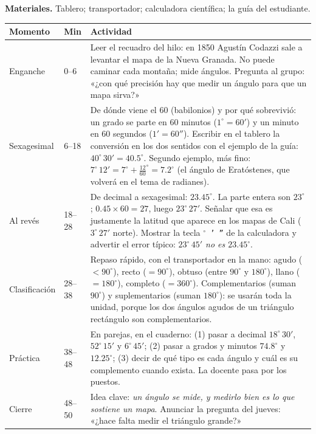\documentclass[11pt]{article}
\begin{document}
\textbf{Materiales.} Tablero; transportador; calculadora científica; la guía del estudiante.

\begin{center}
{\renewcommand{\arraystretch}{1.3}
\begin{tabularx}{\linewidth}{@{}l l X@{}}
  \toprule
  \textbf{Momento} & \textbf{Min} & \textbf{Actividad}\\
  \midrule
  Enganche & 0--6 & Leer el recuadro del hilo: en 1850 Agustín Codazzi sale a levantar el
    mapa de la Nueva Granada. No puede caminar cada montaña; mide ángulos. Pregunta al
    grupo: «¿con qué precisión hay que medir un ángulo para que un mapa sirva?»\\
  Sexagesimal & 6--18 & De dónde viene el 60 (babilonios) y por qué sobrevivió: un grado
    se parte en $60$ minutos ($1^\circ = 60'$) y un minuto en $60$ segundos ($1' = 60''$).
    Escribir en el tablero la conversión en los dos sentidos con el ejemplo de la guía:
    $40^\circ\,30' = \num{40,5}^\circ$. Segundo ejemplo, más fino:
    $7^\circ\,12' = 7^\circ + \frac{12}{60}^{\circ} = \num{7,2}^\circ$ (el ángulo de
    Eratóstenes, que volverá en el tema de radianes).\\
  Al revés & 18--28 & De decimal a sexagesimal: $\num{23,45}^\circ$. La parte entera son
    $23^\circ$; $\num{0,45}\times 60 = 27$, luego $23^\circ\,27'$. Señalar que esa es
    justamente la latitud que aparece en los mapas de Cali ($3^\circ\,27'$ norte). Mostrar
    la tecla \texttt{$^\circ$\,'\,''} de la calculadora y advertir el error típico:
    \emph{$23^\circ\,45'$ no es $\num{23,45}^\circ$}.\\
  Clasificación & 28--38 & Repaso rápido, con el transportador en la mano: agudo
    ($<90^\circ$), recto ($=90^\circ$), obtuso (entre $90^\circ$ y $180^\circ$), llano
    ($=180^\circ$), completo ($=360^\circ$). Complementarios (suman $90^\circ$) y
    suplementarios (suman $180^\circ$): se usarán toda la unidad, porque los dos ángulos
    agudos de un triángulo rectángulo son complementarios.\\
  Práctica & 38--48 & En parejas, en el cuaderno: (1) pasar a decimal $18^\circ\,30'$,
    $52^\circ\,15'$ y $6^\circ\,45'$; (2) pasar a grados y minutos $\num{74,8}^\circ$ y
    $\num{12,25}^\circ$; (3) decir de qué tipo es cada ángulo y cuál es su complemento
    cuando exista. La docente pasa por los puestos.\\
  Cierre & 48--50 & Idea clave: \emph{un ángulo se mide, y medirlo bien es lo que sostiene
    un mapa}. Anunciar la pregunta del jueves: «¿hace falta medir el triángulo grande?»\\
  \bottomrule
\end{tabularx}}
\end{center}
\end{document}
